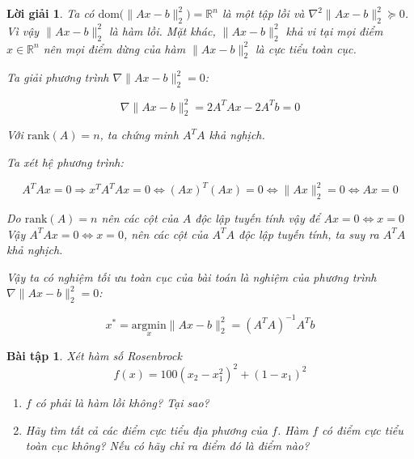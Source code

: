 \documentclass[14pt, a4paper]{article}
\theoremstyle{sltheorem}
\newtheorem{baitap}{Bài tập}
\theoremstyle{soltheorem}
\newtheorem*{loigiai}{Lời giải}
\begin{document}
\begin{loigiai}
        Ta có $\mathrm{dom}\Big( \lVert Ax-b \rVert_2^2\Big)=\mathbb{R}^{n}$ là một tập lồi và $\nabla^2 \lVert Ax - b \rVert_2^2 \succeq 0$. Vì vậy $\lVert Ax - b \rVert_2^2$ là hàm lồi. Mặt khác, $\lVert Ax - b \rVert_2^2$ khả vi tại mọi điểm $x \in \mathbb{R}^{n}$ nên mọi điểm dừng của hàm $\lVert Ax - b \rVert_2^2$ là cực tiểu toàn cục.

        Ta giải phương trình $\nabla \lVert Ax - b \rVert_2^2=0$:

        \begin{equation*}
            \nabla \lVert Ax - b \rVert_2^2 = 2 A^T A x - 2 A^T b = 0
        \end{equation*}

        Với $\mathrm{rank}(A)=n$, ta chứng minh $A^T A$ khả nghịch.

        Ta xét hệ phương trình:

        \begin{equation*}
            A^T A x = 0 \Rightarrow x^T A^T A x = 0 \Leftrightarrow (Ax)^T (Ax) = 0 \Leftrightarrow \lVert Ax \rVert_2^2 =0 \Leftrightarrow Ax = 0
        \end{equation*}

        Do $\mathrm{rank}(A)=n$ nên các cột của $A$ độc lập tuyến tính vậy để $Ax=0 \Leftrightarrow x = 0$
        Vậy $A^T A x = 0 \Leftrightarrow x = 0$, nên các cột của $A^T A$ độc lập tuyến tính, ta suy ra $A^T A$ khả nghịch.

        Vậy ta có nghiệm tối ưu toàn cục của bài toán là nghiệm của phương trình $\nabla \lVert Ax - b \rVert_2^2=0$:

        \begin{equation*}
            x^* = \underset{x}{\mathrm{argmin}}\lVert Ax - b \rVert_2^2=(A^TA)^{-1}A^T b
        \end{equation*}
    \end{loigiai}

    \begin{baitap}
        Xét hàm số Rosenbrock
        \begin{equation*}
            f(x)=100(x_2 - x_1^2)^2 + (1-x_1)^2
        \end{equation*}
        \begin{enumerate}[wide, labelwidth=!, labelindent=0pt,label=\textbf{\arabic*}.]
            \item $f$ có phải là hàm lồi không? Tại sao?
            \item Hãy tìm tất cả các điểm cực tiểu địa phương của $f$. Hàm $f$ có điểm cực tiểu toàn cục không? Nếu có hãy chỉ ra điểm đó là điểm nào?
        \end{enumerate}
    \end{baitap}
\end{document}
